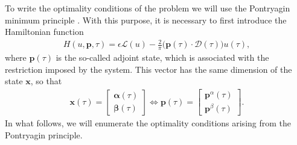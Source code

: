 To write the optimality conditions of the problem we will use the Pontryagin minimum principle \cite[Chapter~2.7]{bryson1975applied}. With this purpose, it is necessary to first introduce the Hamiltonian function 
\begin{align*}\label{eq:hamil}
    H(u,\bm{p},\tau) = \epsilon \mathcal{L}(u) - \frac 2\pi\big(\bm{p}(\tau) \cdot \bm{\mathcal{D}}(\tau)\big)u(\tau),
\end{align*}
where $\bm{p}(\tau)$ is the so-called adjoint state, which is associated with the restriction imposed by the system. This vector has the same dimension of the state $\bm{x}$, so that
\begin{gather}
  \bm{x}(\tau) = \begin{bmatrix} \bm{\alpha}(\tau) \\ \bm{\beta}(\tau) \end{bmatrix} \Leftrightarrow 
  \bm{p}(\tau) = \begin{bmatrix} \bm{p}^\alpha(\tau) \\ \bm{p}^\beta(\tau) \end{bmatrix}.
\end{gather}
In what follows, we will enumerate the optimality conditions arising from the Pontryagin principle.

